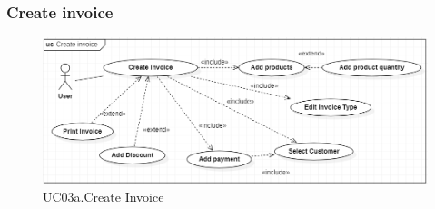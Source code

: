 \documentclass[../thesis.tex]{subfiles}
\begin{document}
\subsubsection{Create invoice}
\begin{figure}[H]
    \centering
    \includegraphics[width=1\textwidth]{images/UCD_CreateInvoice.png}
    \caption{UC03a.Create Invoice}
    \label{fig:UCD-create-invoice}
\end{figure}
\end{document}
